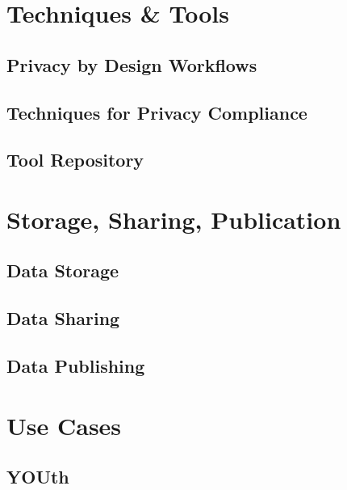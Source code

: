\documentclass[
]{book}
\begin{document}
\hypertarget{part-techniques-tools}{%
\part{Techniques \& Tools}\label{part-techniques-tools}}

\hypertarget{privacy-by-design-workflows}{%
\chapter*{Privacy by Design Workflows}\label{privacy-by-design-workflows}}

\hypertarget{techniques-for-privacy-compliance}{%
\chapter*{Techniques for Privacy Compliance}\label{techniques-for-privacy-compliance}}

\hypertarget{tool-repository}{%
\chapter*{Tool Repository}\label{tool-repository}}

\hypertarget{part-storage-sharing-publication}{%
\part{Storage, Sharing, Publication}\label{part-storage-sharing-publication}}

\hypertarget{data-storage}{%
\chapter*{Data Storage}\label{data-storage}}

\hypertarget{data-sharing}{%
\chapter*{Data Sharing}\label{data-sharing}}

\hypertarget{data-publishing}{%
\chapter*{Data Publishing}\label{data-publishing}}

\hypertarget{part-use-cases}{%
\part{Use Cases}\label{part-use-cases}}

\hypertarget{youth}{%
\chapter{YOUth}\label{youth}}

  
\end{document}
